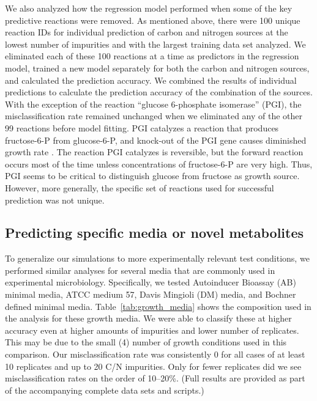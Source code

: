 \documentclass[12pt]{article}
\begin{document}
We also analyzed how the regression model performed when some of the key predictive reactions were removed. As mentioned above, there were 100 unique reaction IDs for individual prediction of carbon and nitrogen sources at the lowest number of impurities and with the largest training data set analyzed. We eliminated each of these 100 reactions at a time as predictors in the regression model, trained a new model separately for both the carbon and nitrogen sources, and calculated the prediction accuracy. We combined the results of individual predictions to calculate the prediction accuracy of the combination of the sources. With the exception of the reaction ``glucose 6-phosphate isomerase'' (PGI), the misclassification rate remained unchanged when we eliminated any of the other 99 reactions before model fitting. PGI catalyzes a reaction that produces fructose-6-P from glucose-6-P, and knock-out of the PGI gene causes diminished growth rate \cite{Canonacoetal2001}. The reaction PGI catalyzes is reversible, but the forward reaction occurs most of the time unless concentrations of fructose-6-P are very high. Thus, PGI seems to be critical to distinguish glucose from fructose as growth source. However, more generally, the specific set of reactions used for successful prediction was not unique.


\subsection{Predicting specific media or novel metabolites}

To generalize our simulations to more experimentally relevant test conditions, we performed similar analyses for several media that are commonly used in experimental microbiology. Specifically, we tested Autoinducer Bioassay (AB) minimal media, ATCC medium 57, Davis Mingioli (DM) media, and Bochner defined minimal media. Table~\ref{tab:growth_media} shows the composition used in the analysis for these growth media. We were able to classify these at higher accuracy even at higher amounts of impurities and lower number of replicates. This may be due to the small (4) number of growth conditions used in this comparison. Our misclassification rate was consistently 0 for all cases of at least 10 replicates and up to 20 C/N impurities. Only for fewer replicates did we see misclassification rates on the order of 10--20\%. (Full results are provided as part of the accompanying complete data sets and scripts.)
\end{document}
